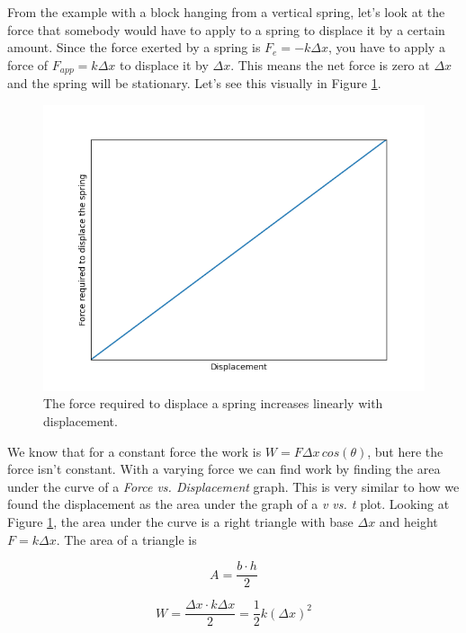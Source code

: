\documentclass[12pt]{book}
\begin{document}
From the example with a block hanging from a vertical spring, let's look at the force that somebody would have to apply to a spring to displace it by a certain amount. Since the force exerted by a spring is $F_e = -k \Delta x$, you have to apply a force of $F_{app} = k \Delta x$ to displace it by $\Delta x$. This means the net force is zero at $\Delta x$ and the spring will be stationary. Let's see this visually in Figure \ref{fspring}.

\begin{figure}[H]
\centering
\includegraphics[scale=0.6]{force_spring.png}
\caption{The force required to displace a spring increases linearly with displacement.}
\label{fspring}
\end{figure}

We know that for a constant force the work is $W = F \Delta x \, cos(\theta)$, but here the force isn't constant. With a varying force we can find work by finding the area under the curve of a \textit{Force vs. Displacement} graph. This is very similar to how we found the displacement as the area under the graph of a \textit{v vs. t} plot. Looking at Figure \ref{fspring}, the area under the curve is a right triangle with base $\Delta x$ and height $F = k \Delta x$. The area of a triangle is

\begin{equation}
A = \frac{b \cdot h}{2}
\end{equation} 

\begin{equation}
W = \frac{\Delta x \cdot k \Delta x}{2} = \frac{1}{2}k (\Delta x)^2
\end{equation}
\end{document}
